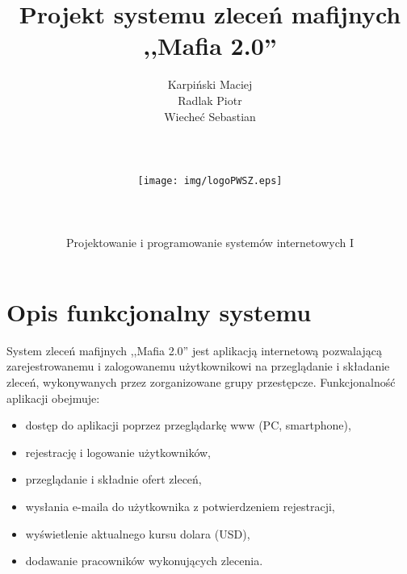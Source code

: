 \documentclass[12pt,a4paper]{article}
\author{Karpiński Maciej\\Radlak Piotr\\Wiecheć Sebastian\\\\\\\\\texttt{[image: img/logoPWSZ.eps]}\\\\\\\\Projektowanie i programowanie systemów internetowych I}
\title{Projekt systemu zleceń mafijnych\\,,Mafia 2.0''}
\begin{document}
	\maketitle
	\thispagestyle{empty}
	\clearpage

	\tableofcontents
	\newpage

	\section{Opis funkcjonalny systemu}
		\indent System zleceń mafijnych ,,Mafia 2.0'' jest aplikacją internetową pozwalającą zarejestrowanemu i zalogowanemu użytkownikowi na przeglądanie i składanie zleceń,
		wykonywanych przez zorganizowane grupy przestępcze. Funkcjonalność aplikacji obejmuje:
		\begin{itemize}
			\item dostęp do aplikacji poprzez przeglądarkę www (PC, smartphone),
			\item rejestrację i logowanie użytkowników,
			\item przeglądanie i składnie ofert zleceń,
			\item wysłania e-maila do użytkownika z potwierdzeniem rejestracji,
			\item wyświetlenie aktualnego kursu dolara (USD),
			\item dodawanie pracowników wykonujących zlecenia.
		\end{itemize}
	\newpage

\end{document}
